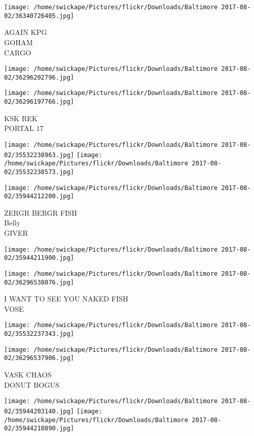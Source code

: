 \documentclass[10pt,letterpaper]{article}
\begin{document}
\texttt{[image: /home/swickape/Pictures/flickr/Downloads/Baltimore 2017-08-02/36340726405.jpg]}

AGAIN KPG\\
GOHAM\\
CARGO\\
\pagebreak

\texttt{[image: /home/swickape/Pictures/flickr/Downloads/Baltimore 2017-08-02/36296202796.jpg]}

\vspace{0.25in}
\texttt{[image: /home/swickape/Pictures/flickr/Downloads/Baltimore 2017-08-02/36296197766.jpg]}

KSK REK\\
PORTAL 17\\
\pagebreak

\texttt{[image: /home/swickape/Pictures/flickr/Downloads/Baltimore 2017-08-02/35532238963.jpg]}
\texttt{[image: /home/swickape/Pictures/flickr/Downloads/Baltimore 2017-08-02/35532238573.jpg]}

\texttt{[image: /home/swickape/Pictures/flickr/Downloads/Baltimore 2017-08-02/35944212200.jpg]}

ZERGR BERGR FISH\\
Belly\\
GIVER\\
\pagebreak

\texttt{[image: /home/swickape/Pictures/flickr/Downloads/Baltimore 2017-08-02/35944211900.jpg]}

\vspace{0.25in}
\texttt{[image: /home/swickape/Pictures/flickr/Downloads/Baltimore 2017-08-02/36296538076.jpg]}

I WANT TO SEE YOU NAKED FISH\\
VOSE\\
\pagebreak

\texttt{[image: /home/swickape/Pictures/flickr/Downloads/Baltimore 2017-08-02/35532237343.jpg]}

\vspace{0.25in}
\texttt{[image: /home/swickape/Pictures/flickr/Downloads/Baltimore 2017-08-02/36296537906.jpg]}

VASK CHAOS\\
DONUT BOGUS\\
\pagebreak

\texttt{[image: /home/swickape/Pictures/flickr/Downloads/Baltimore 2017-08-02/35944203140.jpg]}
\texttt{[image: /home/swickape/Pictures/flickr/Downloads/Baltimore 2017-08-02/35944210890.jpg]}
\end{document}
